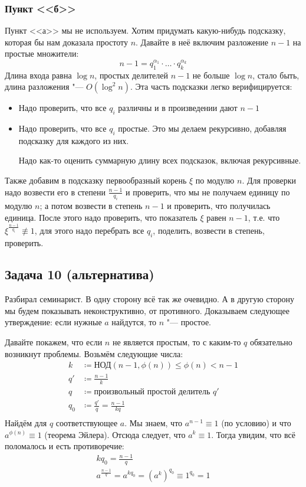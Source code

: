 	\subsubsection{Пункт <<б>>}
		Пункт <<а>> мы не используем.
		Хотим придумать какую-нибудь подсказку, которая бы нам доказала простоту $n$.
		Давайте в неё включим разложение $n-1$ на простые множители:
		\[ n-1 = q_1^{\alpha_1} \cdot \dots \cdot q_k^{\alpha_k} \]
		Длина входа равна $\log n$, простых делителей $n-1$ не больше $\log n$,
		стало быть, длина разложения "--- $O(\log^2 n)$.
		Эта часть подсказки легко верифицируется:
		\begin{itemize}
			\item Надо проверить, что все $q_i$ различны и в произведении дают $n-1$
			\item
				Надо проверить, что все $q_i$ простые.
				Это мы делаем рекурсивно, добавляя подсказку для каждого из них.
				\begin{Rem}
					Надо как-то оценить суммарную длину всех подсказок, включая рекурсивные.
					\TODO
				\end{Rem}
		\end{itemize}

		Также добавим в подсказку первообразный корень $\xi$ по модулю $n$.
		Для проверки надо возвести его в степени $\frac{n-1}{q_i}$ и проверить, что
		мы не получаем единицу по модулю $n$;
		а потом возвести в степень $n-1$ и проверить, что получилась единица.
		После этого надо проверить, что показатель $\xi$ равен $n-1$, т.е.
		что $\xi^{\frac{n-1}{q_i}} \nequiv 1$, для этого надо перебрать все $q_i$,
		поделить, возвести в степень, проверить.

\subsection{Задача 10 (альтернатива)}
	Разбирал семинарист.
	В одну сторону всё так же очевидно.
	А в другую сторону мы будем показывать неконструктивно, от противного.
	Доказываем следующее утверждение: если нужные $a$ найдутся, то $n$ "--- простое.

	Давайте покажем, что если $n$ не является простым, то с каким-то $q$ обязательно возникнут проблемы.
	Возьмём следующие числа:
	\begin{align*}
		k &\coloneq \textrm{НОД}(n-1, \phi(n)) \le \phi(n) < n - 1 \\
		q' &\coloneq \frac{n-1}{k} \\
		q &\coloneq \text{произвольный простой делитель $q'$} \\
		q_0 &\coloneq \frac{q'}{q} = \frac{n-1}{kq} \\
	\end{align*}
	Найдём для $q$ соответствующее $a$.
	Мы знаем, что $a^{n-1} \equiv 1$ (по условию) и что $a^{\phi(n)} \equiv 1$ (теорема Эйлера).
	Отсюда следует, что $a^k \equiv 1$.
	Тогда увидим, что всё поломалось и есть противоречие:
	\begin{gather*}
		kq_0 = \frac{n-1}q \\
		a^{\frac{n-1}{q}} = a^{kq_0} = (a^k)^{q_0} \equiv 1^{q_0} = 1
	\end{gather*}

